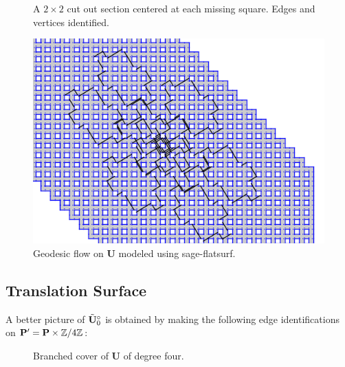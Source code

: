 \documentclass[]{article}
\def\btUos{\btU_0^\circ}
\begin{document}
\begin{figure}[H]
\centering

\caption{A $2\times2$ cut out section centered at each missing square. Edges and vertices identified.}
\label{fig:quotient}
\end{figure}

\begin{figure}[H]
\centering
\includegraphics[width=4in.]{closed2.png}
\caption{Geodesic flow on $\mathbf{U}$ modeled using sage-flatsurf.}
\label{fig:complicated}
\end{figure}

\subsection{Translation Surface}

A better picture of $\btUos$ is obtained by making the following edge identifications on $\mathbf{P'}=\mathbf{P}\times\mathbb{Z}/4\mathbb{Z}$:


\begin{figure}[H]
\centering

\label{fig:utilda0}
\caption{Branched cover of $\mathbf{U}$ of degree four.}
\end{figure}
\end{document}
